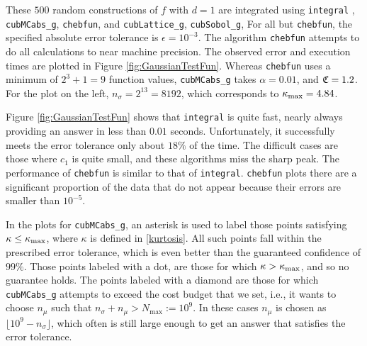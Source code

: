 \documentclass{iitthesis}
\begin{document}
These $500$ random constructions of $f$ with $d=1$ are integrated using {\tt integral} \cite{Shampone08},  {\tt cubMCabs\_g}, {\tt chebfun}\cite{Chebfun14}, and {\tt cubLattice\_g}\cite{JimHic16a}, {\tt cubSobol\_g}\cite{HicJim16a}, 
%
For all but {\tt chebfun}, the specified absolute error tolerance is $\epsilon=10^{-3}$.  The algorithm {\tt chebfun} attempts to do all calculations to near machine precision.  The observed error and execution times are plotted in Figure \ref{fig:GaussianTestFun}.  Whereas {\tt chebfun} uses a minimum of $2^3+1=9$ function values, {\tt cubMCabs\_g}  takes $\alpha=0.01$, and $\mathfrak{C}=1.2$.  For the plot on the left, $n_\sigma=2^{13}=8192$, which corresponds to  $\kappa_{\max}=4.84$. 
%

Figure \ref{fig:GaussianTestFun} shows that {\tt integral} is quite fast, nearly always providing an answer in less than $0.01$ seconds.  Unfortunately, it successfully meets the error tolerance only about $18\%$ of the time.  The difficult cases are those where $c_1$ is quite small, and these algorithms miss the sharp peak.  The performance of {\tt chebfun} is similar to that of {\tt integral}. {\tt chebfun} plots there are a significant proportion of the data that do not appear because their errors are smaller than $10^{-5}$.
%

In the plots for {\tt cubMCabs\_g}, an asterisk is used to label those points satisfying $\kappa \le \kappa_{\max}$, where $\kappa$ is defined in \eqref{kurtosis}. All such points fall within the prescribed error tolerance,
which is even better than the guaranteed confidence of $99\%$.  Those points labeled with a dot, are those for which $\kappa > \kappa_{\max}$, and so no guarantee holds. The points labeled with a diamond are those for which  {\tt cubMCabs\_g}  attempts to exceed the cost budget that we set, i.e., it wants to choose $n_\mu$ such that $n_{\sigma}+n_\mu > N_{\max}:=10^9$. In these cases $n_\mu$ is chosen as $\lfloor 10^9 - n_\sigma \rfloor$, which often is still large enough to get an answer that satisfies the error tolerance. 
\end{document}
